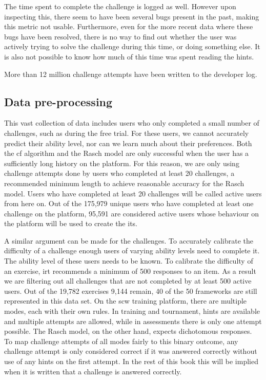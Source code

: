 The time spent to complete the challenge is logged as well.
However upon inspecting this, there seem to have been several bugs present in the past, making this metric not usable.
Furthermore, even for the more recent data where these bugs have been resolved, there is no way to find out whether the user was actively trying to solve the challenge during this time, or doing something else.
It is also not possible to know how much of this time was spent reading the hints.

More than 12 million challenge attempts have been written to the developer log.

\subsection{Data pre-processing}
This vast collection of data includes users who only completed a small number of challenges, such as during the free trial.
For these users, we cannot accurately predict their ability level, nor can we learn much about their preferences.
Both the \gls{cf} algorithm and the Rasch model are only successful when the user has a sufficiently long history on the platform.
For this reason, we are only using challenge attempts done by users who completed at least 20 challenges, a recommended minimum length to achieve reasonable accuracy for the Rasch model.
Users who have completed at least 20 challenges will be called active users from here on.
Out of the 175,979 unique users who have completed at least one challenge on the platform, 95,591 are considered active users whose behaviour on the platform will be used to create the \gls{its}.

A similar argument can be made for the challenges.
To accurately calibrate the difficulty of a challenge enough users of varying ability levels need to complete it.
The ability level of these users needs to be known.
To calibrate the difficulty of an exercise, \gls{irt} recommends a minimum of 500 responses to an item.
As a result we are filtering out all challenges that are not completed by at least 500 active users.
Out of the 19,782 exercises 9,144 remain, 40 of the 50 frameworks are still represented in this data set.
On the \gls{scw} training platform, there are multiple modes, each with their own rules.
In training and tournament, hints are available and multiple attempts are allowed, while in assessments there is only one attempt possible.
The Rasch model, on the other hand, expects dichotomous responses.
To map challenge attempts of all modes fairly to this binary outcome, any challenge attempt is only considered correct if it was answered correctly without use of any hints on the first attempt.
In the rest of this book this will be implied when it is written that a challenge is answered correctly.

